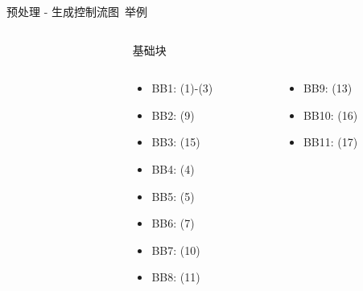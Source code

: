 \documentclass{beamer}
\begin{document}
    \begin{frame}{预处理 - 生成控制流图~举例}
        \begin{columns}[T]
        \begin{column}{.4\textwidth}
        \end{column}
        \begin{column}{.55\textwidth}
            \begin{block}{基础块}
                \begin{columns}[T]
                    \begin{column}{.45\textwidth}
                        \begin{itemize}
                            \item BB1: (1)-(3)
                            \item BB2: (9)
                            \item BB3: (15)
                            \item BB4: (4)
                            \item BB5: (5)
                            \item BB6: (7)
                            \item BB7: (10)
                            \item BB8: (11)
                        \end{itemize}
                    \end{column}
                    \begin{column}{.45\textwidth}
                        \begin{itemize}
                            \item BB9: (13)
                            \item BB10: (16)
                            \item BB11: (17)

\end{itemize}
\end{column}
\end{columns}
\end{block}
\end{column}
\end{columns}
\end{frame}
\end{document}
